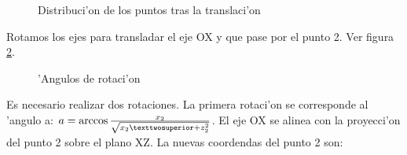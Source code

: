 \begin{figure}[h!]
	\begin{center}
     	\end{center}
    	\caption{Distribuci'on de los puntos tras la translaci'on}\label{fig:triang2}
\end{figure}

Rotamos los ejes para transladar el eje OX y que pase por el punto 2.
Ver figura \ref{fig:triang3}.

\begin{figure}[h!]
	\begin{center}
     	\end{center}
    	\caption{'Angulos de rotaci'on}\label{fig:triang3}
\end{figure}

Es necesario realizar dos rotaciones. La primera rotaci'on se corresponde al 'angulo a: $a = \arccos {x_2 \over {\sqrt{x_2²+z_2^2}}}$. El eje OX se alinea con la proyecci'on del punto 2 sobre el plano XZ. La nuevas coordendas del punto 2 son:


